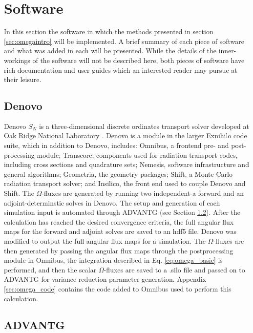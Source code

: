 \section{Software}
\label{sec:software}

In this section the software in which the methods presented in section
\ref{sec:omegaintro} will be implemented. A brief summary of each piece of
software and what was added in each will be presented.
While the details of the inner-workings of the software will not be described
here, both pieces of software have rich documentation and user guides which an
interested reader may pursue at their leisure.

\subsection{Denovo}

Denovo $S_N$ is a three-dimensional discrete ordinates transport solver
developed at Oak Ridge National Laboratory \cite{evans_denovo:_2010}. Denovo is a module in the larger
Exnihilo code suite, which in addition to Denovo,
includes: Omnibus, a frontend pre- and post-processing module; Transcore,
components used for radiation transport codes, including cross sections and
quadrature sets; Nemesis, software infrastructure and general algorithms;
Geometria, the geometry packages; Shift, a Monte Carlo radiation transport
solver; and Insilico, the front end used to couple Denovo and Shift. The
$\Omega$-fluxes are generated by running two independent-a forward and an
adjoint-determinstic solves in Denovo. The setup and generation of each
simulation input is automated through ADVANTG (see Section \ref{sec:advantg}).
After the calculation has reached the desired convergence criteria, the
full angular flux maps for the
forward and adjoint solves are saved to an hdf5 \cite{hdf5} file. Denovo was
modified to output the full angular flux maps for a simulation. The
$\Omega$-fluxes are then generated by passing the angular flux maps through the
postprocessing module in Omnibus, the integration described in Eq.
\eqref{eq:omega_basic} is performed, and then the scalar $\Omega$-fluxes are saved
to a .silo file and passed on to ADVANTG for variance reduction parameter
generation. Appendix \ref{sec:omega_code} contains the code added to Omnibus
used to perform this calculation.

\subsection{ADVANTG}
\label{sec:advantg}

